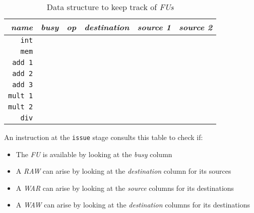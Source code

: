 \documentclass[english]{article}
\begin{document}
\begin{table}
  \bigskip
  \centering
  \begin{tabular}{r|c|cccc}
    \hline
    \textit{name}   & \textit{busy} & \textit{op} & \textit{destination} & \textit{source 1} & \textit{source 2} \\ \hline
    \texttt{int}    &               &             &                      &                   &                   \\
    \texttt{mem}    &               &             &                      &                   &                   \\ \hline
    \texttt{add 1}  &               &             &                      &                   &                   \\
    \texttt{add 2}  &               &             &                      &                   &                   \\
    \texttt{add 3}  &               &             &                      &                   &                   \\ \hline
    \texttt{mult 1} &               &             &                      &                   &                   \\
    \texttt{mult 2} &               &             &                      &                   &                   \\ \hline
    \texttt{div}    &               &             &                      &                   &                   \\
  \end{tabular}
  \caption{Data structure to keep track of \textit{FUs}}
  \label{tab:data-structure-keep-track-functional-units}
  \bigskip
\end{table}

An instruction at the \texttt{issue} stage consults this table to check if:

\begin{itemize}
  \item The \textit{FU} is available by looking at the \textit{busy} column
  \item A \textit{RAW} can arise by looking at the \textit{destination} column for its sources
  \item A \textit{WAR} can arise by looking at the \textit{source} columns for its destinations
  \item A \textit{WAW} can arise by looking at the \textit{destination} columns for its destinations
\end{itemize}
\end{document}
